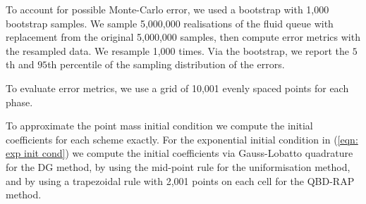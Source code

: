 To account for possible Monte-Carlo error, we used a bootstrap with 1,000 bootstrap samples. We sample 5,000,000 realisations of the fluid queue with replacement from the original 5,000,000 samples, then compute error metrics with the resampled data. We resample 1,000 times. Via the bootstrap, we report the \(5\)th and \(95\)th percentile of the sampling distribution of the errors. 

To evaluate error metrics, we use a grid of 10,001 evenly spaced points for each phase.

To approximate the point mass initial condition we compute the initial coefficients for each scheme exactly. For the exponential initial condition in (\ref{eqn: exp init cond}) we compute the initial coefficients via Gauss-Lobatto quadrature for the DG method, by using the mid-point rule for the uniformisation method, and by using a trapezoidal rule with 2,001 points on each cell for the QBD-RAP method. 


